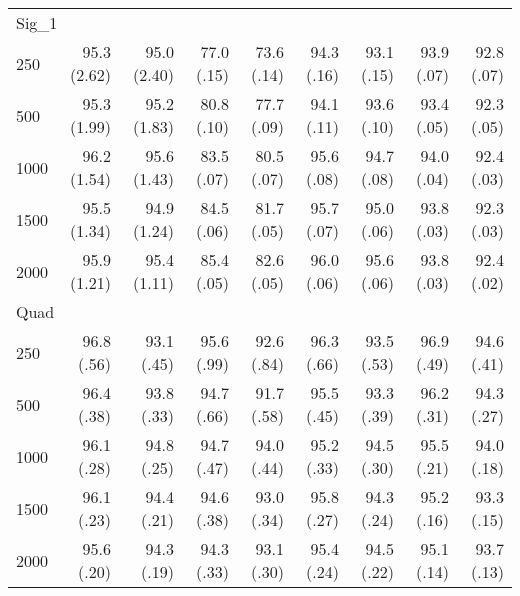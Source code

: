 \begin{tabular}{lrrrrrrrr}
 \multicolumn{9}{l}{Sig\_1} \\ 
250 & 95.3 (2.62) & 95.0 (2.40) & 77.0 (.15) & 73.6 (.14) & 94.3 (.16) & 93.1 (.15) & 93.9 (.07) & 92.8 (.07) \\ 
  500 & 95.3 (1.99) & 95.2 (1.83) & 80.8 (.10) & 77.7 (.09) & 94.1 (.11) & 93.6 (.10) & 93.4 (.05) & 92.3 (.05) \\ 
  1000 & 96.2 (1.54) & 95.6 (1.43) & 83.5 (.07) & 80.5 (.07) & 95.6 (.08) & 94.7 (.08) & 94.0 (.04) & 92.4 (.03) \\ 
  1500 & 95.5 (1.34) & 94.9 (1.24) & 84.5 (.06) & 81.7 (.05) & 95.7 (.07) & 95.0 (.06) & 93.8 (.03) & 92.3 (.03) \\ 
  2000 & 95.9 (1.21) & 95.4 (1.11) & 85.4 (.05) & 82.6 (.05) & 96.0 (.06) & 95.6 (.06) & 93.8 (.03) & 92.4 (.02) \\ 
          
 \multicolumn{9}{l}{Quad} \\ 
250 & 96.8 (.56) & 93.1 (.45) & 95.6 (.99) & 92.6 (.84) & 96.3 (.66) & 93.5 (.53) & 96.9 (.49) & 94.6 (.41) \\ 
  500 & 96.4 (.38) & 93.8 (.33) & 94.7 (.66) & 91.7 (.58) & 95.5 (.45) & 93.3 (.39) & 96.2 (.31) & 94.3 (.27) \\ 
  1000 & 96.1 (.28) & 94.8 (.25) & 94.7 (.47) & 94.0 (.44) & 95.2 (.33) & 94.5 (.30) & 95.5 (.21) & 94.0 (.18) \\ 
  1500 & 96.1 (.23) & 94.4 (.21) & 94.6 (.38) & 93.0 (.34) & 95.8 (.27) & 94.3 (.24) & 95.2 (.16) & 93.3 (.15) \\ 
  2000 & 95.6 (.20) & 94.3 (.19) & 94.3 (.33) & 93.1 (.30) & 95.4 (.24) & 94.5 (.22) & 95.1 (.14) & 93.7 (.13) \\ 
   \hline
\end{tabular}

